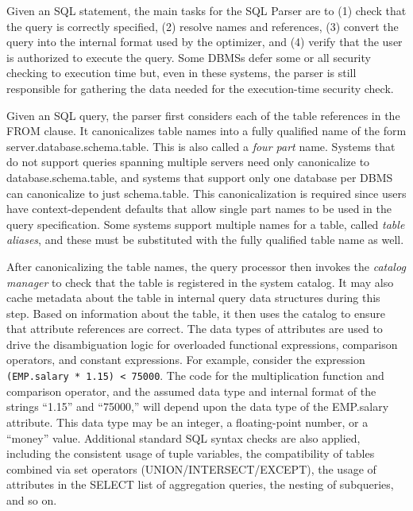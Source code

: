 \documentclass[a4paper,11pt,twoside,openright]{book}
\begin{document}
Given an SQL statement, the main tasks for the SQL Parser are to
  (1) check that the query is correctly specified, (2) resolve names and
  references, (3) convert the query into the internal format used by the
  optimizer, and (4) verify that the user is authorized to execute the
  query. Some DBMSs defer some or all security checking to execution
  time but, even in these systems, the parser is still responsible for
  gathering the data needed for the execution-time security check.

Given an SQL query, the parser first considers each of the table
references in the FROM clause. It canonicalizes table names into a fully
qualified name of the form server.database.schema.table. This is also
called a \emph{four part} name. Systems that do not support queries
spanning multiple servers need only canonicalize to
database.schema.table, and systems that support only one database per
DBMS can canonicalize to just schema.table. This canonicalization is
required since users have context-dependent defaults that allow single
part names to be used in the query specification. Some systems support
multiple names for a table, called \emph{table aliases}, and these must
be substituted with the fully qualified table name as well.

After canonicalizing the table names, the query processor then invokes
the \emph{catalog manager} to check that the table is registered in the
system catalog. It may also cache metadata about the table in internal
query data structures during this step. Based on information about the
table, it then uses the catalog to ensure that attribute references are
correct. The data types of attributes are used to drive the
disambiguation logic for overloaded functional expressions, comparison
operators, and constant expressions. For example, consider the
expression \texttt{(EMP.salary * 1.15) < 75000}. The code for the
multiplication function and comparison operator, and the assumed data
type and internal format of the strings ``1.15'' and ``75000,'' will
depend upon the data type of the EMP.salary attribute. This data type
may be an integer, a floating-point number, or a ``money'' value.
Additional standard SQL syntax checks are also applied, including the
consistent usage of tuple variables, the compatibility of tables
combined via set operators (UNION/INTERSECT/EXCEPT), the usage of
attributes in the SELECT list of aggregation queries, the nesting of
subqueries, and so on.
\end{document}
